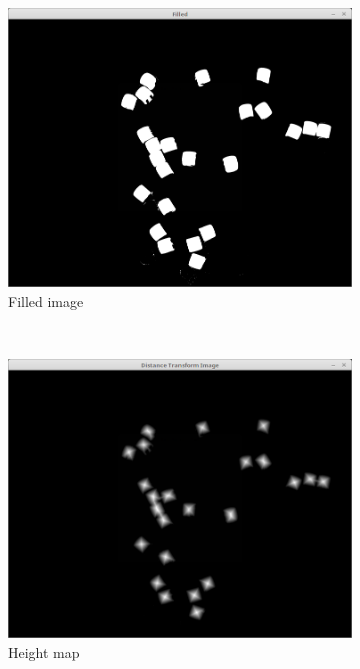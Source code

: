 \documentclass{../Vorlage/sebDenCls}
\begin{document}
\begin{figure}[htp]
 \centering 	
 \begin{subfigure}{0.5\textwidth}
 	 \includegraphics[width=.9\textwidth]{filled} 
 	 \caption{Filled image\label{BEISPIEL}}
 \end{subfigure}%
~
 \begin{subfigure}{0.5\textwidth}
 	\includegraphics[width=.9\textwidth]{distanceTransform} 
 	\caption{Height map\label{distance}}
 \end{subfigure}\\
  \begin{subfigure}{0.5\textwidth}

\end{subfigure}
\end{figure}
\end{document}
